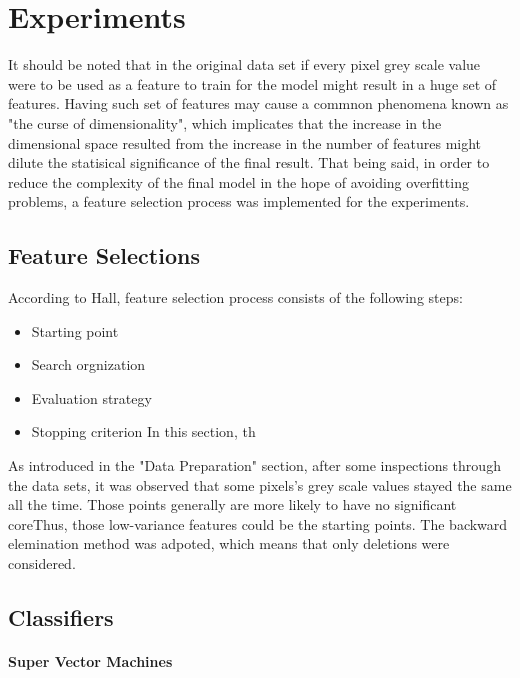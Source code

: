 
\section{Experiments}
\label{sec:expts}
It should be noted that in the original data set if every pixel grey scale value were to be used as a feature to train for the model might result in a huge set of features. Having such set of features may cause a commnon phenomena known as "the curse of dimensionality", which implicates that the increase in the dimensional space resulted from the increase in the number of features might dilute the statisical significance of the final result.\cite{bellman}
That being said, in order to reduce the complexity of the final model in the hope of avoiding overfitting problems, a feature selection process was implemented for the experiments.\cite{hall}
\subsection{Feature Selections}
\label{feature}
According to Hall, feature selection process consists of the following steps:
\begin{itemize}
	\item Starting point
	\item Search orgnization
	\item Evaluation strategy
	\item Stopping criterion
In this section, th
\end{itemize}
As introduced in the "Data Preparation" section, after some inspections through the data sets, it was observed that some pixels's grey scale values stayed the same all the time. Those points generally are more likely to have no significant coreThus, those low-variance features could be the starting points.
The backward elemination method was adpoted, which means that only deletions were considered.
\subsection{Classifiers}
\label{class}
\paragraph{Super Vector Machines}

